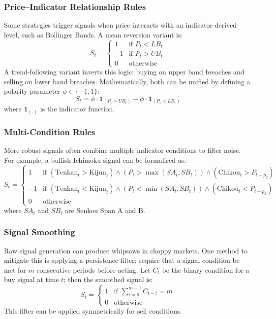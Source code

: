 \subsubsection{Price–Indicator Relationship Rules}

Some strategies trigger signals when price interacts with an indicator-derived level, such as Bollinger Bands. A mean reversion variant is:
\[
S_t =
\begin{cases}
1 & \text{if } P_t < LB_t \\
-1 & \text{if } P_t > UB_t \\
0 & \text{otherwise}
\end{cases}
\]
A trend-following variant inverts this logic: buying on upper band breaches and selling on lower band breaches. Mathematically, both can be unified by defining a polarity parameter $\phi \in \{-1, 1\}$:
\[
S_t = \phi \cdot \mathbf{1}_{(P_t > UB_t)} - \phi \cdot \mathbf{1}_{(P_t < LB_t)}
\]
where $\mathbf{1}_{(\cdot)}$ is the indicator function.

\subsubsection{Multi-Condition Rules}

More robust signals often combine multiple indicator conditions to filter noise. For example, a bullish Ichimoku signal can be formalised as:
\[
S_t =
\begin{cases}
1 & \text{if } (\text{Tenkan}_t > \text{Kijun}_t) \land (P_t > \max(SA_t, SB_t)) \land (\text{Chikou}_t > P_{t-p_2}) \\
-1 & \text{if } (\text{Tenkan}_t < \text{Kijun}_t) \land (P_t < \min(SA_t, SB_t)) \land (\text{Chikou}_t < P_{t-p_2}) \\
0 & \text{otherwise}
\end{cases}
\]
where $SA_t$ and $SB_t$ are Senkou Span A and B.

\subsubsection{Signal Smoothing}

Raw signal generation can produce whipsaws in choppy markets. One method to mitigate this is applying a persistence filter: require that a signal condition be met for $m$ consecutive periods before acting. Let $C_t$ be the binary condition for a buy signal at time $t$; then the smoothed signal is:
\[
S_t =
\begin{cases}
1 & \text{if } \sum_{i=0}^{m-1} C_{t-i} = m \\
0 & \text{otherwise}
\end{cases}
\]
This filter can be applied symmetrically for sell conditions.

